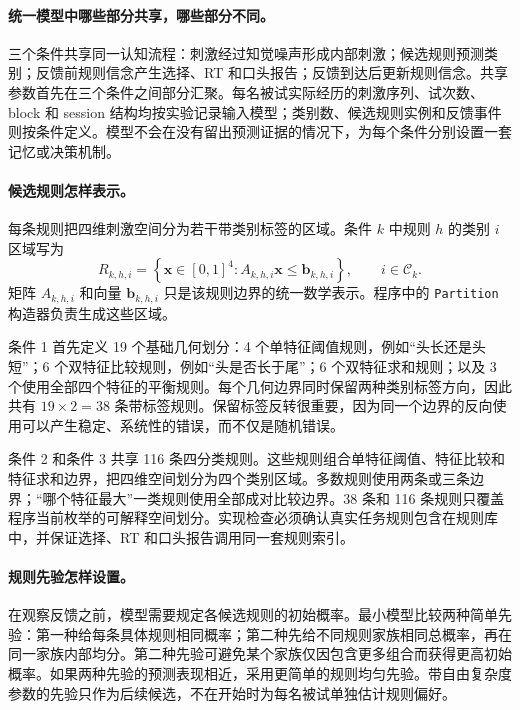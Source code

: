 \paragraph{统一模型中哪些部分共享，哪些部分不同。}
三个条件共享同一认知流程：刺激经过知觉噪声形成内部刺激；候选规则预测类别；反馈前规则信念产生选择、RT 和口头报告；反馈到达后更新规则信念。共享参数首先在三个条件之间部分汇聚。每名被试实际经历的刺激序列、试次数、block 和 session 结构均按实验记录输入模型；类别数、候选规则实例和反馈事件则按条件定义。模型不会在没有留出预测证据的情况下，为每个条件分别设置一套记忆或决策机制。

\paragraph{候选规则怎样表示。}
每条规则把四维刺激空间分为若干带类别标签的区域。条件 $k$ 中规则 $h$ 的类别 $i$ 区域写为
\begin{equation}
    R_{k,h,i}
    =
    \left\{\mathbf x\in[0,1]^4:
    A_{k,h,i}\mathbf x\leq\mathbf b_{k,h,i}\right\},
    \qquad i\in\mathcal C_k .
    \label{eq:newplan-region}
\end{equation}
矩阵 $A_{k,h,i}$ 和向量 $\mathbf b_{k,h,i}$ 只是该规则边界的统一数学表示。程序中的 \texttt{Partition} 构造器负责生成这些区域。

条件 1 首先定义 19 个基础几何划分：4 个单特征阈值规则，例如“头长还是头短”；6 个双特征比较规则，例如“头是否长于尾”；6 个双特征求和规则；以及 3 个使用全部四个特征的平衡规则。每个几何边界同时保留两种类别标签方向，因此共有 $19\times2=38$ 条带标签规则。保留标签反转很重要，因为同一个边界的反向使用可以产生稳定、系统性的错误，而不仅是随机错误。

条件 2 和条件 3 共享 116 条四分类规则。这些规则组合单特征阈值、特征比较和特征求和边界，把四维空间划分为四个类别区域。多数规则使用两条或三条边界；“哪个特征最大”一类规则使用全部成对比较边界。38 条和 116 条规则只覆盖程序当前枚举的可解释空间划分。实现检查必须确认真实任务规则包含在规则库中，并保证选择、RT 和口头报告调用同一套规则索引。

\paragraph{规则先验怎样设置。}
在观察反馈之前，模型需要规定各候选规则的初始概率。最小模型比较两种简单先验：第一种给每条具体规则相同概率；第二种先给不同规则家族相同总概率，再在同一家族内部均分。第二种先验可避免某个家族仅因包含更多组合而获得更高初始概率。如果两种先验的预测表现相近，采用更简单的规则均匀先验。带自由复杂度参数的先验只作为后续候选，不在开始时为每名被试单独估计规则偏好。

